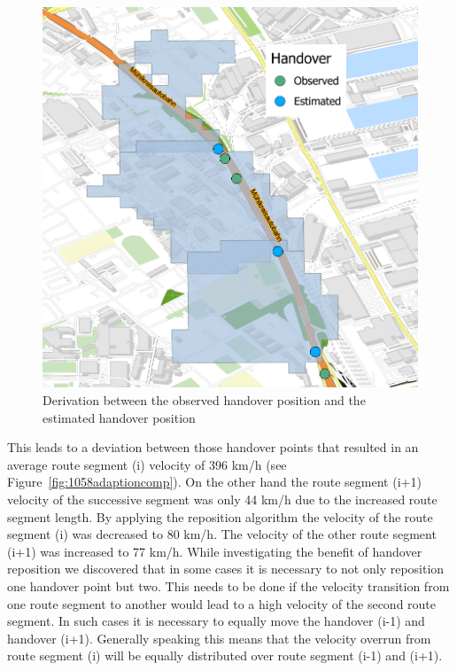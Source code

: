 \documentclass[master,english]{hgbthesis}
\begin{document}
\begin{figure}
\centering
\includegraphics[width=0.7\linewidth]{./images/1058handoveradapted}
\caption{Derivation between the observed handover position and the estimated handover position}
\label{fig:1058handoveradapted}
\end{figure}
This leads to a deviation between those handover points that resulted in an average route segment (i) velocity of 396 km/h (see Figure~\ref{fig:1058adaptioncomp}). On the other hand the route segment (i+1) velocity of the successive segment was only 44 km/h due to the increased route segment length. By applying the reposition algorithm the velocity of the route segment (i) was decreased to 80 km/h. The velocity of the other route segment (i+1) was increased to 77 km/h. 
While investigating the benefit of handover reposition we discovered that in some cases it is necessary to not only reposition one handover point but two. This needs to be done if the velocity transition from one route segment to another would lead to a high velocity of the second route segment. In such cases it is necessary to equally move the handover (i-1) and handover (i+1). Generally speaking this means that the velocity overrun from route segment (i) will be equally distributed over route segment (i-1) and (i+1).
\end{document}
